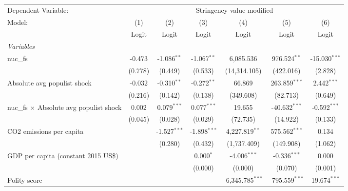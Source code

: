 
\begingroup
\centering
\begin{tabular}{lcccccc}
   \toprule
   Dependent Variable: & \multicolumn{6}{c}{Stringency value modified}\\
   Model:                                         & (1)     & (2)            & (3)            & (4)                & (5)              & (6)\\  
                                                  &  Logit  & Logit          & Logit          & Logit              & Logit            & Logit\\  
   \midrule
   \emph{Variables}\\
   nuc\_fs                                        & -0.473  & -1.086$^{**}$  & -1.067$^{**}$  & 6,085.536          & 976.524$^{**}$   & -15.030$^{***}$\\   
                                                  & (0.778) & (0.449)        & (0.533)        & (14,314.105)       & (422.016)        & (2.828)\\   
   Absolute avg populist shock                    & -0.032  & -0.310$^{**}$  & -0.272$^{**}$  & 66.869             & 263.859$^{***}$  & 2.442$^{***}$\\   
                                                  & (0.216) & (0.142)        & (0.138)        & (349.608)          & (82.713)         & (0.649)\\   
   nuc\_fs $\times$ Absolute avg populist shock   & 0.002   & 0.079$^{***}$  & 0.077$^{***}$  & 19.655             & -40.632$^{***}$  & -0.592$^{***}$\\   
                                                  & (0.045) & (0.028)        & (0.029)        & (72.735)           & (14.922)         & (0.133)\\   
   CO2 emissions per capita                       &         & -1.527$^{***}$ & -1.898$^{***}$ & 4,227.819$^{**}$   & 575.562$^{***}$  & 0.134\\   
                                                  &         & (0.280)        & (0.432)        & (1,737.409)        & (149.908)        & (1.062)\\   
   GDP per capita (constant 2015 US\$)            &         &                & 0.000$^{*}$    & -4.006$^{***}$     & -0.336$^{***}$   & 0.000\\   
                                                  &         &                & (0.000)        & (0.000)            & (0.070)          & (0.001)\\   
   Polity score                                   &         &                &                & -6,345.785$^{***}$ & -795.559$^{***}$ & 19.674$^{***}$\\   

\end{tabular}
